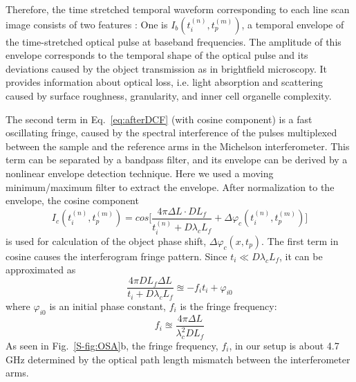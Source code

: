 \documentclass[aps,pra,reprint,superscriptaddress]{revtex4-1}
\begin{document}
Therefore, the time stretched temporal waveform corresponding to each line scan image consists of two features \cite{mahjoubfar2014label}: One is $I_b (t_i^{(n)}, t_p^{(m)})$, a temporal envelope of the time-stretched optical pulse at baseband frequencies. The amplitude of this envelope corresponds to the temporal shape of the optical pulse and its deviations caused by the object transmission as in brightfield microscopy. It provides information about optical loss, i.e. light absorption and scattering caused by surface roughness, granularity, and inner cell organelle complexity. 

The second term in Eq.~\ref{eq:afterDCF} (with cosine component) is a fast oscillating fringe, caused by the spectral interference of the pulses multiplexed between the sample and the reference arms in the Michelson interferometer. This term can be separated by a bandpass filter, and its envelope can be derived by a nonlinear envelope detection technique. Here we used a moving minimum/maximum filter to extract the envelope. After normalization to the envelope, the cosine component 
\begin{equation}
I_c (t_i^{(n)}, t_p^{(m)}) = cos\Bigg[ \frac{4\pi\Delta L \cdot D L_f}{t_i^{(n)} + D\lambda_c L_f} + \Delta \varphi_c(t_i^{(n)}, t_p^{(m)}) \Bigg]
\end{equation}
is used for calculation of the object phase shift, $\Delta\varphi_c(x,t_p)$. The first term in cosine causes the interferogram fringe pattern. Since $t_i \ll D \lambda_c L_f$, it can be approximated as
\begin{equation}
\frac{4\pi D L_f \Delta L}{t_i + D \lambda_c L_f} \approxeq - f_i t_i + \varphi_{i0}
\end{equation}
where $\varphi_{i0}$ is an initial phase constant, $f_i$ is the fringe frequency:
\begin{equation}
f_i \approxeq \frac{4\pi \Delta L}{\lambda_c^2 D L_f}
\end{equation}
As seen in Fig.~\ref{S-fig:OSA}b, the fringe frequency, $f_i$, in our setup is about 4.7 GHz determined by the optical path length mismatch between the interferometer arms.
\end{document}
